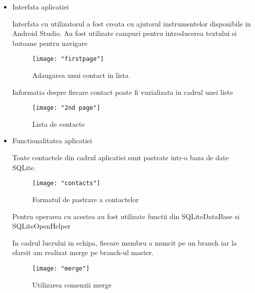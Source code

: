 \begin{itemize}
	\item Interfata aplicatiei
	

Interfata cu utilizatorul a fost creata cu ajutorul instrumentelor disponibile in Android Studio. Au fost utilizate campuri pentru introducerea textului si butoane pentru navigare
		\begin{figure}[h!]
			\centering
 			 \texttt{[image: "firstpage"]}
 			 \caption{Adaugarea unui contact in lista}
 			 \label{fig:Pagina principala}
		\end{figure}	
	\newpage
Informatia despre fiecare contact poate fi vuzializata in cadrul unei liste
	
	\begin{figure}[h!]
			\centering
 			 \texttt{[image: "2nd page"]}
 			 \caption{Lista de contacte}
 			 \label{fig:AnimePage}
		\end{figure}

\newpage
	\item Functionalitatea aplicatiei
	
	Toate contactele din cadrul aplicatiei sunt pastrate intr-o baza de date SQLite. 
	\begin{figure}[h!]
			\centering
 			 \texttt{[image: "contacts"]}
 			 \caption{Formatul de pastrare a contactelor}
 			 \label{fig:Calcui}
		\end{figure}
		
Pentru operarea cu acestea au fost utilizate functii din SQLiteDataBase si SQLiteOpenHelper




In cadrul lucrului in echipa, fiecare membru a muncit pe un branch iar la sfarsit am realizat merge pe branch-ul master.

	\begin{figure}[h!]
			\centering
 			 \texttt{[image: "merge"]}
 			 \caption{Utilizarea comenzii merge}
 			 \label{fig:Calcui}
		\end{figure}


\end{itemize}
